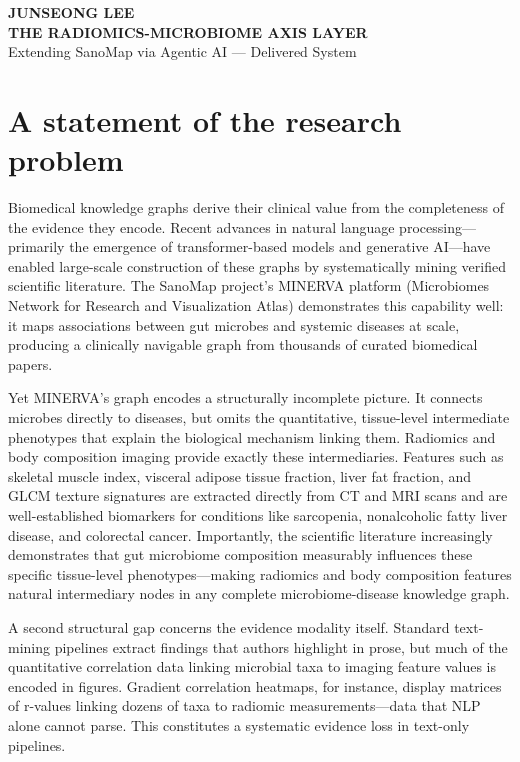\documentclass[12pt, letterpaper]{article}
\begin{document}
\thispagestyle{empty}
\begin{center}
    \textbf{JUNSEONG LEE} \\
    \textbf{THE RADIOMICS-MICROBIOME AXIS LAYER} \\
    Extending SanoMap via Agentic AI — Delivered System
\end{center}

\section{A statement of the research problem}

Biomedical knowledge graphs derive their clinical value from the completeness of the evidence they encode. Recent advances in natural language processing—primarily the emergence of transformer-based models and generative AI—have enabled large-scale construction of these graphs by systematically mining verified scientific literature. The SanoMap project's MINERVA platform (Microbiomes Network for Research and Visualization Atlas) demonstrates this capability well: it maps associations between gut microbes and systemic diseases at scale, producing a clinically navigable graph from thousands of curated biomedical papers.

Yet MINERVA's graph encodes a structurally incomplete picture. It connects microbes directly to diseases, but omits the quantitative, tissue-level intermediate phenotypes that explain the biological mechanism linking them. Radiomics and body composition imaging provide exactly these intermediaries. Features such as skeletal muscle index, visceral adipose tissue fraction, liver fat fraction, and GLCM texture signatures are extracted directly from CT and MRI scans and are well-established biomarkers for conditions like sarcopenia, nonalcoholic fatty liver disease, and colorectal cancer. Importantly, the scientific literature increasingly demonstrates that gut microbiome composition measurably influences these specific tissue-level phenotypes---making radiomics and body composition features natural intermediary nodes in any complete microbiome-disease knowledge graph.

A second structural gap concerns the evidence modality itself. Standard text-mining pipelines extract findings that authors highlight in prose, but much of the quantitative correlation data linking microbial taxa to imaging feature values is encoded in figures. Gradient correlation heatmaps, for instance, display matrices of r-values linking dozens of taxa to radiomic measurements—data that NLP alone cannot parse. This constitutes a systematic evidence loss in text-only pipelines.
\end{document}

